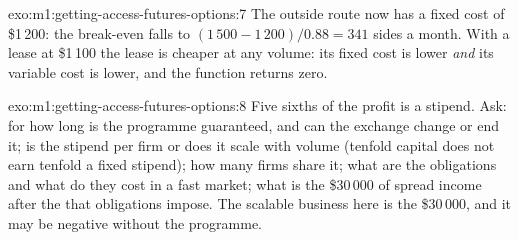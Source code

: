 \begin{solution}{exo:m1:getting-access-futures-options:7}
The outside route now has a fixed cost of \$1\,200: the break-even falls to
$(1\,500 - 1\,200)/0.88 = 341$ sides a month. With a lease at \$1\,100 the lease
is cheaper at any volume: its fixed cost is lower \emph{and} its variable
cost is lower, and the function returns zero.
\end{solution}

\begin{solution}{exo:m1:getting-access-futures-options:8}
Five sixths of the profit is a stipend. Ask: for how long is the programme
guaranteed, and can the exchange change or end it; is the stipend per firm
or does it scale with volume (tenfold capital does not earn tenfold a fixed
stipend); how many firms share it; what are the obligations and what do they
cost in a fast market; what is the \$30\,000 of spread income after the
 that obligations impose. The scalable business here is the
\$30\,000, and it may be negative without the programme.
\end{solution}

